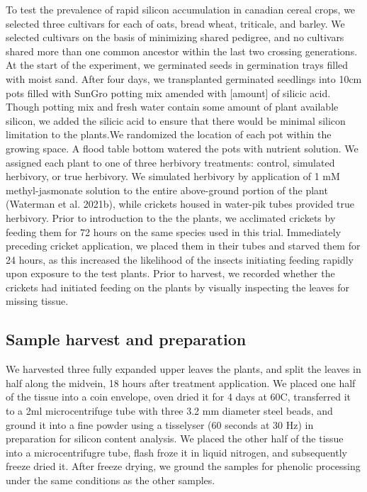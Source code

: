 \documentclass[12pt, letterpaper, ]{report}
\begin{document}
To test the prevalence of rapid silicon accumulation in canadian cereal crops, we selected three cultivars for each of oats, bread wheat, triticale, and barley. We selected cultivars on the basis of minimizing shared pedigree, and no cultivars shared more than one common ancestor within the last two crossing generations. At the start of the experiment, we germinated seeds in germination trays filled with moist sand. After four days, we transplanted germinated seedlings into 10cm pots filled with SunGro potting mix amended with [amount] of silicic acid. Though potting mix and fresh water contain some amount of plant available silicon, we added the silicic acid to ensure that there would be minimal silicon limitation to the plants.We randomized the location of each pot within the growing space. A flood table bottom watered the pots with nutrient solution. We assigned each plant to one of three herbivory treatments: control, simulated herbivory, or true herbivory. We simulated herbivory by application of 1 mM methyl-jasmonate solution to the entire above-ground portion of the plant (Waterman et al. 2021b), while crickets housed in water-pik tubes provided true herbivory. Prior to introduction to the the plants, we acclimated crickets by feeding them for 72 hours on the same species used in this trial. Immediately preceding cricket application, we placed them in their tubes and starved them for 24 hours, as this increased the likelihood of the insects initiating feeding rapidly upon exposure to the test plants. Prior to harvest, we recorded whether the crickets had initiated feeding on the plants by visually inspecting the leaves for missing tissue. 

\subsection{Sample harvest and preparation}

We harvested three fully expanded upper leaves the plants, and split the leaves in half along the midvein, 18 hours after treatment application. We placed one half of the tissue into a coin envelope, oven dried it for 4 days at 60\degree C, transferred it to a 2ml microcentrifuge tube with three 3.2 mm diameter steel beads, and ground it into a fine powder using a tisselyser (60 seconds at 30 Hz) in preparation for silicon content analysis. We placed the other half of the tissue into a microcentrifugre tube, flash froze it in liquid nitrogen, and subsequently freeze dried it. After freeze drying, we ground the samples for phenolic processing under the same conditions as the other samples.
\end{document}
